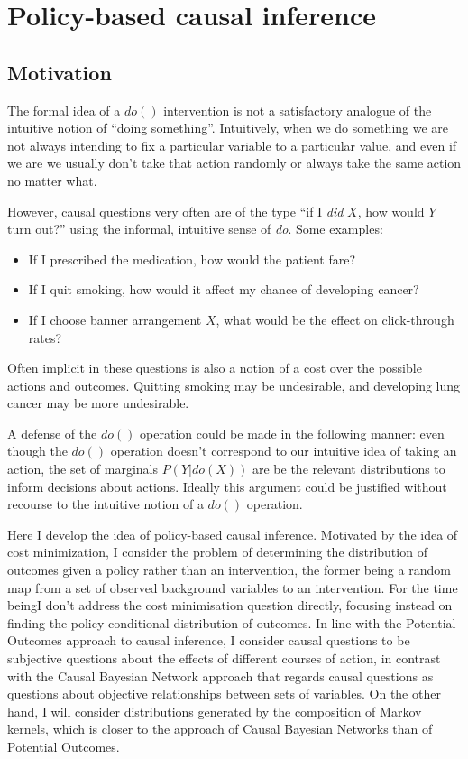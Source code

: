 \section{Policy-based causal inference}

\subsection{Motivation}

The formal idea of a $do()$ intervention is not a satisfactory analogue of the intuitive notion of ``doing something''. Intuitively, when we do something we are not always intending to fix a particular variable to a particular value, and even if we are we usually don't take that action randomly or always take the same action no matter what.

However, causal questions very often are of the type ``if I \emph{did} $X$, how would $Y$ turn out?'' using the informal, intuitive sense of \emph{do}. Some examples: 
\begin{itemize}
    \item If I prescribed the medication, how would the patient fare?
    \item If I quit smoking, how would it affect my chance of developing cancer?
    \item If I choose banner arrangement $X$, what would be the effect on click-through rates?
\end{itemize}

Often implicit in these questions is also a notion of a cost over the possible actions and outcomes. Quitting smoking may be undesirable, and developing lung cancer may be more undesirable. 

A defense of the $do()$ operation could be made in the following manner: even though the $do()$ operation doesn't correspond to our intuitive idea of taking an action, the set of marginals $P(Y|do(X))$ are be the relevant distributions to inform decisions about actions. Ideally this argument could be justified without recourse to the intuitive notion of a $do()$ operation.

Here I develop the idea of policy-based causal inference. Motivated by the idea of cost minimization, I consider the problem of determining the distribution of outcomes given a policy rather than an intervention, the former being a random map from a set of observed background variables to an intervention. For the time beingI don't address the cost minimisation question directly, focusing instead on finding the policy-conditional distribution of outcomes. In line with the Potential Outcomes approach to causal inference, I consider causal questions to be subjective questions about the effects of different courses of action, in contrast with the Causal Bayesian Network approach that regards causal questions as questions about objective relationships between sets of variables. On the other hand, I will consider distributions generated by the composition of Markov kernels, which is closer to the approach of Causal Bayesian Networks than of Potential Outcomes.

